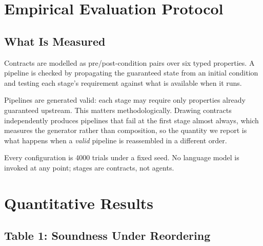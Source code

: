 \documentclass[10pt,journal,compsoc,twocolumn]{IEEEtran}
\begin{document}
\section{Empirical Evaluation Protocol}



\subsection{What Is Measured}


Contracts are modelled as pre/post-condition pairs over six typed properties. A pipeline is checked by propagating the guaranteed state from an initial condition and testing each stage's requirement against what is available when it runs.

Pipelines are generated valid: each stage may require only properties already guaranteed upstream. This matters methodologically. Drawing contracts independently produces pipelines that fail at the first stage almost always, which measures the generator rather than composition, so the quantity we report is what happens when a \textit{valid} pipeline is reassembled in a different order.

Every configuration is 4000 trials under a fixed seed. No language model is invoked at any point; stages are contracts, not agents.




\section{Quantitative Results}



\subsection{Table 1: Soundness Under Reordering}
\begin{table}[htbp]
\centering
{}
\end{table}
\end{document}
